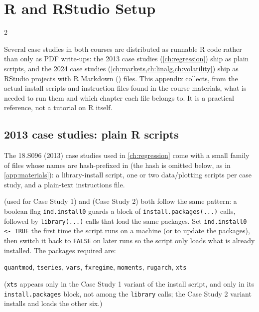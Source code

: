 \chapter{R and RStudio Setup}\label{app:rsetup}
\begin{paracol}{2}

Several case studies in both courses are distributed as runnable R code rather than only as PDF
write-ups: the 2013 case studies (\cref{ch:regression}) ship as plain  scripts, and the 2024
case studies (\cref{ch:markets,ch:linalg,ch:volatility}) ship as RStudio projects with R Markdown
() files. This appendix collects, from the actual install scripts and instruction files
found in the course materials, what is needed to run them and which chapter each file belongs to. It
is a practical reference, not a tutorial on R itself.

\section{2013 case studies: plain R scripts}

The 18.S096 (2013) case studies used in \cref{ch:regression} come with a small family of files whose
names are hash-prefixed in  (the hash is omitted below, as in
\cref{app:materials}): a library-install script, one or two data/plotting scripts per case study, and
a plain-text instructions file.

\begin{coursenote}
 (used for Case Study 1) and
 (Case Study 2) both follow the same
pattern: a boolean flag \texttt{ind.install0} guards a block of \texttt{install.packages(...)} calls,
followed by \texttt{library(...)} calls that load the same packages. Set \texttt{ind.install0 <- TRUE}
the first time the script runs on a machine (or to update the packages), then switch it back to
\texttt{FALSE} on later runs so the script only loads what is already installed. The packages required
are:
\begin{center}
\texttt{quantmod}, \texttt{tseries}, \texttt{vars}, \texttt{fxregime}, \texttt{moments},
\texttt{rugarch}, \texttt{xts}
\end{center}
(\texttt{xts} appears only in the Case Study 1 variant of the install script, and only in its
\texttt{install.packages} block, not among the \texttt{library} calls; the Case Study 2 variant installs and
loads the other six.)
\end{coursenote}


\end{paracol}
